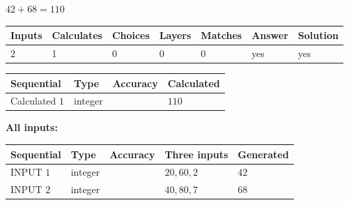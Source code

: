 \documentclass[12pt]{article}
\begin{document}
 
\noindent{}
 
 

 
 
 
\noindent{}
 
 

$ %
42 +  %
68=   %
110$
 
 
\noindent{}
 
 

 
   
   
   
   
\noindent\begin{tabular}{|l|l|l|l|l|l|l|}
 \hline
Inputs & Calculates & Choices & Layers & Matches & Answer & Solution \\ \hline
 2  & 
 1  & 
 0
  & 
 0  & 
 0  & 
  yes & 
  yes 
  \\ \hline
 \end{tabular}
   
   
   
   
\noindent{}
   
   
  
  
\noindent\begin{tabular}{|l|l|l|l|}
\hline
 Sequential & Type & Accuracy & Calculated \\ 
\hline
 
 
  Calculated $  1 $ & integer &  & 
  $ 110 $ 
 \\  \hline  
 \end{tabular}
   
   
   
   
\noindent\vspace{0.1in}\hspace{-0.08in} {\textbf{\Large{All inputs: }}}
   
   
  
  
\noindent\begin{tabular}{|l|l|l|l|l|}
\hline
 Sequential & Type & Accuracy & Three inputs & Generated \\ 
\hline
 
 
  INPUT $  1 $ & integer &  & $
 20
 , 
 60
 , 
 2
 $ & $ 42 $ 
 \\  \hline  
 
 
  INPUT $  2 $ & integer &  & $
 40
 , 
 80
 , 
 7
 $ & $ 68 $ 
 \\  \hline  
 \end{tabular}
   
\end{document}

